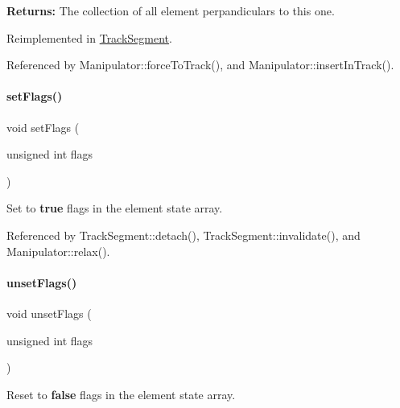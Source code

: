 {\bfseries Returns\+:} The collection of all element perpandiculars to this one. 

Reimplemented in \mbox{\hyperlink{classKite_1_1TrackSegment_aa0ba92ebf19f596537dc051c090d5736}{Track\+Segment}}.



Referenced by Manipulator\+::force\+To\+Track(), and Manipulator\+::insert\+In\+Track().

\mbox{\label{classKite_1_1TrackElement_aeb14f94914af58657a0dc2f50ec98df5}} 
\paragraph{\texorpdfstring{set\+Flags()}{setFlags()}}
{\footnotesize\ttfamily void set\+Flags (\begin{DoxyParamCaption}\item[{unsigned int}]{flags }\end{DoxyParamCaption})\hspace{0.3cm}{\ttfamily [inline]}}

Set to {\bfseries true} {\ttfamily flags} in the element state array. 

Referenced by Track\+Segment\+::detach(), Track\+Segment\+::invalidate(), and Manipulator\+::relax().

\mbox{\label{classKite_1_1TrackElement_a1a6fac115cb81db48e3ac9ffa0721bb5}} 
\paragraph{\texorpdfstring{unset\+Flags()}{unsetFlags()}}
{\footnotesize\ttfamily void unset\+Flags (\begin{DoxyParamCaption}\item[{unsigned int}]{flags }\end{DoxyParamCaption})\hspace{0.3cm}{\ttfamily [inline]}}

Reset to {\bfseries false} {\ttfamily flags} in the element state array. 

